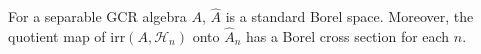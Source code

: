 For a separable GCR algebra $A$, $\hat{A}$ is a standard Borel space. Moreover, the quotient map of $\text{irr}(A, \mathcal{H}_n)$ onto $\hat{A}_n$ has a Borel cross section for each $n$.
